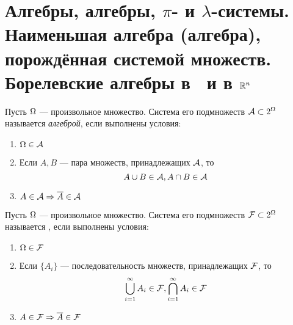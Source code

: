 \section{Алгебры, \gm алгебры, $\pi$- и $\lambda$-системы. Наименьшая алгебра (\gm алгебра), порождённая системой множеств. Борелевские \gm алгебры в \RR~и в $\mathbb{R}^n$}

\begin{definition}[Алгебра]
	Пусть $\Omega$ --- произвольное множество. Система его подмножеств $\mathcal{A} \subset 2^{\Omega}$ называется {\it алгеброй}, если выполнены условия:
	\begin{enumerate}
		\item $\Omega \in \mathcal{A}$
		\item Если $A, B$ --- пара множеств, принадлежащих $\mathcal{A}$, то
			$$A \cup B \in \mathcal{A}, A \cap B \in \mathcal{A}$$
		\item $A \in \mathcal{A} \Rightarrow \overline{A} \in \mathcal{A}$
	\end{enumerate}
\end{definition}

\begin{definition}[\gmалгебра]
	Пусть $\Omega$ --- произвольное множество. Система его подмножеств $\mathcal{F} \subset 2^{\Omega}$ называется {\it {}}, если выполнены условия:
	\begin{enumerate}
		\item $\Omega \in \mathcal{F}$
		\item Если $\{A_i\}$ --- последовательность множеств, принадлежащих $\mathcal{F}$, то 
			$$\bigcup_{i=1}^{\infty} A_i \in \mathcal{F}, \bigcap_{i=1}^{\infty} A_i \in \mathcal{F}$$
		\item $A \in \mathcal{F} \Rightarrow \overline{A} \in \mathcal{F}$
	\end{enumerate}
\end{definition}

